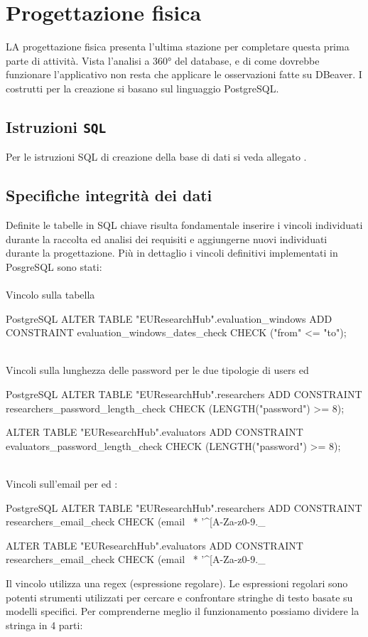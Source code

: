 \documentclass{report}
\begin{document}
\section{Progettazione fisica}
LA progettazione fisica presenta l'ultima stazione per completare questa prima parte di attività.  Vista l'analisi a 360° del database, e di come dovrebbe funzionare l'applicativo non resta che applicare le osservazioni fatte su DBeaver. I costrutti per la creazione si basano sul linguaggio PostgreSQL.
\subsection{Istruzioni \texttt{SQL}}
Per le istruzioni SQL di creazione della base di dati si veda allegato . 

\subsection{Specifiche integrità dei dati}
Definite le tabelle in SQL chiave risulta fondamentale inserire i vincoli individuati durante la raccolta ed analisi dei requisiti e aggiungerne nuovi individuati durante la progettazione.  
Più in dettaglio i vincoli definitivi implementati in PosgreSQL sono stati:\\
\phantom{This text will be invisible}\\
Vincolo sulla tabella 
\begin{imtaCode}{PostgreSQL}
ALTER TABLE "EUResearchHub".evaluation_windows
ADD CONSTRAINT evaluation_windows_dates_check CHECK ("from" <= "to");
\end{imtaCode}
\phantom{This text will be invisible}\\
Vincoli sulla lunghezza delle password per le due tipologie di users  ed 
\begin{imtaCode}{PostgreSQL}
ALTER TABLE "EUResearchHub".researchers
ADD CONSTRAINT researchers_password_length_check CHECK (LENGTH("password") >= 8);

ALTER TABLE "EUResearchHub".evaluators
ADD CONSTRAINT evaluators_password_length_check CHECK (LENGTH("password") >= 8);
\end{imtaCode}
\phantom{This text will be invisible}\\
Vincoli sull'email per  ed :
\begin{imtaCode}{PostgreSQL}
ALTER TABLE "EUResearchHub".researchers
ADD CONSTRAINT researchers_email_check CHECK (email ~* '^[A-Za-z0-9._%

ALTER TABLE "EUResearchHub".evaluators
ADD CONSTRAINT researchers_email_check CHECK (email ~* '^[A-Za-z0-9._%
\end{imtaCode}
Il vincolo utilizza una regex (espressione regolare). Le espressioni regolari sono potenti strumenti utilizzati per cercare e confrontare stringhe di testo basate su modelli specifici.  Per comprenderne meglio il funzionamento possiamo dividere la stringa in 4 parti: 
\end{document}

